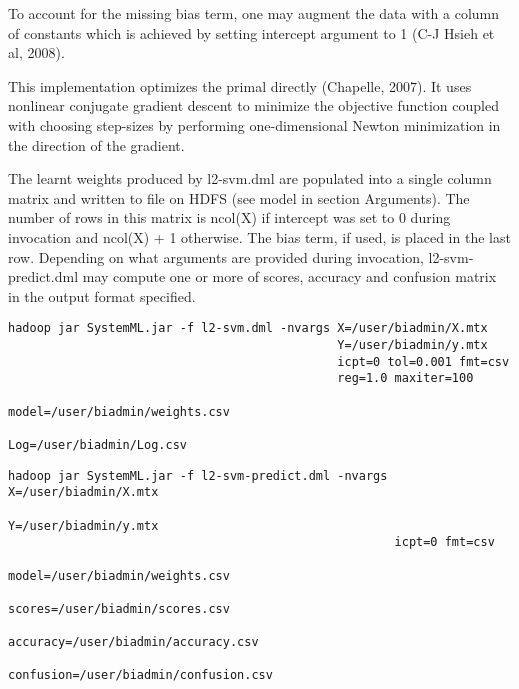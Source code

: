 To account for the missing bias term, one may augment the data with a column
of constants which is achieved by setting intercept argument to 1 (C-J Hsieh 
et al, 2008).

This implementation optimizes the primal directly (Chapelle, 2007). It uses 
nonlinear conjugate gradient descent to minimize the objective function 
coupled with choosing step-sizes by performing one-dimensional Newton 
minimization in the direction of the gradient.
\\


The learnt weights produced by l2-svm.dml are populated into a single column matrix 
and written to file on HDFS (see model in section Arguments). The number of rows in 
this matrix is ncol(X) if intercept was set to 0 during invocation and ncol(X) + 1 
otherwise. The bias term, if used, is placed in the last row. Depending on what arguments
are provided during invocation, l2-svm-predict.dml may compute one or more of scores, 
accuracy and confusion matrix in the output format specified. 
\\


\begin{verbatim}
hadoop jar SystemML.jar -f l2-svm.dml -nvargs X=/user/biadmin/X.mtx 
                                              Y=/user/biadmin/y.mtx 
                                              icpt=0 tol=0.001 fmt=csv
                                              reg=1.0 maxiter=100 
                                              model=/user/biadmin/weights.csv
                                              Log=/user/biadmin/Log.csv
\end{verbatim}

\begin{verbatim}
hadoop jar SystemML.jar -f l2-svm-predict.dml -nvargs X=/user/biadmin/X.mtx 
                                                      Y=/user/biadmin/y.mtx 
                                                      icpt=0 fmt=csv
                                                      model=/user/biadmin/weights.csv
                                                      scores=/user/biadmin/scores.csv
                                                      accuracy=/user/biadmin/accuracy.csv
                                                      confusion=/user/biadmin/confusion.csv
\end{verbatim}


